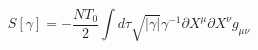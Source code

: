 \begin{equation}
S[\gamma]=-\frac{NT_0}{2}\int d\tau \sqrt{|\gamma|}\gamma^{-1}\partial X^\mu
\partial X^\nu g_{\mu\nu}
\end{equation}

